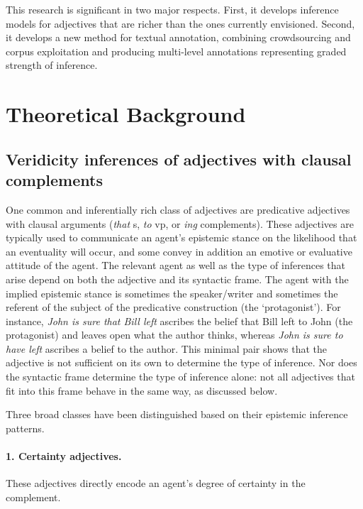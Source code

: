 \documentclass[10pt]{article}
\begin{document}
This research is significant in two major respects. First, it develops inference models for adjectives that are richer than the ones currently envisioned. Second, it develops a new method for textual annotation, combining crowdsourcing and corpus exploitation and producing multi-level annotations representing graded strength of inference.

\section{Theoretical Background}
\vspace{-.2mm}

\subsection{Veridicity inferences of adjectives with clausal complements}\label{sec-veridicity}
\vspace {-2mm}

One common and inferentially rich class of adjectives are predicative adjectives with clausal arguments (\emph{that} {\sc s}, \emph{to} {\sc vp}, or \emph{ing} complements). These adjectives are typically used to communicate an agent's epistemic stance on the likelihood that an eventuality will occur, and some convey in addition an emotive or evaluative attitude of the agent. The relevant agent as well as the type of inferences that arise depend
on both the adjective and its syntactic frame.  The agent with the
implied epistemic stance is sometimes the speaker/writer and sometimes
the referent of the subject of the predicative construction (the
`protagonist').  For instance, \textit{John is sure that Bill left}
ascribes the belief that Bill left to John (the protagonist) and
leaves open what the author thinks, whereas \textit{John is sure to have
left} ascribes a belief to the author. This minimal pair shows that the adjective is not sufficient on its own to determine the type of inference. 
Nor does the syntactic frame determine the type of inference alone: not all adjectives that fit into this frame behave in the same way, as discussed below.

Three broad classes have been distinguished based on their epistemic inference patterns. 

 
\vspace{-.2in}
\paragraph{1. Certainty adjectives.} \hspace{-.1in}These adjectives directly encode an agent's degree of certainty in the complement.
\end{document}
